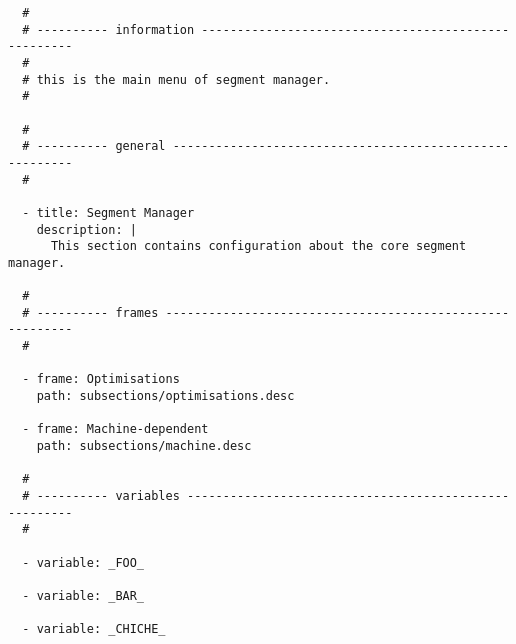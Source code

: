 \begin{verbatim}
  #
  # ---------- information ----------------------------------------------------
  #
  # this is the main menu of segment manager.
  #

  #
  # ---------- general --------------------------------------------------------
  #

  - title: Segment Manager
    description: |
      This section contains configuration about the core segment manager.

  #
  # ---------- frames ---------------------------------------------------------
  #

  - frame: Optimisations
    path: subsections/optimisations.desc

  - frame: Machine-dependent
    path: subsections/machine.desc

  #
  # ---------- variables ------------------------------------------------------
  #

  - variable: _FOO_

  - variable: _BAR_

  - variable: _CHICHE_
\end{verbatim}
